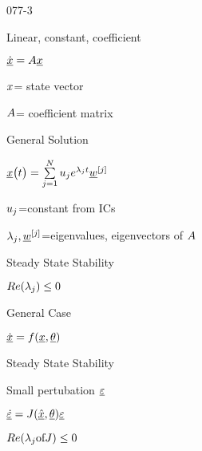 \begin{mitframe}{077-3}
\begin{listone}
	\item Linear, constant, coefficient
    	\begin{listtwo}
        	\item $\uline{\dot{\disp}}=\helmholtz\uline{\disp}$
            	\begin{listthree}
                	\item $\disp$= state vector
                    \item $\helmholtz$= coefficient matrix
                \end{listthree}
        \end{listtwo}
\item General Solution
	\begin{listtwo}
    	\item $\uline{\disp}\big(\timet\big)=\sum\limits_{j=1}^{\nummoles}\forcepot_j\e^{\wavel_j\timet}\vort^{[j]}$
        	\begin{listthree}
            	\item $\forcepot_j$=constant from ICs
                \item $\wavel_j,\vort^{[j]}$=eigenvalues, eigenvectors of $\helmholtz$
            \end{listthree}
    \item Steady State Stability
    	\begin{listthree}
        	\item $\reynolds(\wavel_j)\leq{0}$
                    \end{listthree}
    \end{listtwo}
	\item General Case
    	\begin{listtwo}
        	\item $\uline{\dot{\disp}}=\fug(\uline{\disp},\uline{\theta})$
            \item Steady State Stability
            	\begin{listthree}
                	\item Small pertubation $\uline{\varepsilon}$
                    \item $\uline{\dot{\varepsilon}}=J(\uline{\hat{\disp}},\uline{\theta})\uline{\varepsilon}$
                    \item $\reynolds(\wavel_j \textnormal{of} J)\leq{0}$
                    
                \end{listthree}
          \end{listtwo}
\end{listone}    
\end{mitframe}